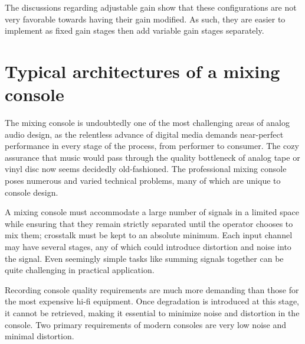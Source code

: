 The discussions regarding adjustable gain show that these configurations are
not very favorable towards having their gain modified. As such, they are easier
to implement as fixed gain stages then add variable gain stages separately.


%


\newpage
\section{Typical architectures of a mixing console}

The mixing console is undoubtedly one of the most challenging areas of analog
audio design, as the relentless advance of digital media demands near-perfect
performance in every stage of the process, from performer to consumer. The cozy
assurance that music would pass through the quality bottleneck of analog tape
or vinyl disc now seems decidedly old-fashioned. The professional mixing
console poses numerous and varied technical problems, many of which are unique
to console design.

A mixing console must accommodate a large number of signals in a limited space
while ensuring that they remain strictly separated until the operator chooses
to mix them; crosstalk must be kept to an absolute minimum. Each input channel
may have several stages, any of which could introduce distortion and noise into
the signal. Even seemingly simple tasks like summing signals together can be
quite challenging in practical application.

Recording console quality requirements are much more demanding than those for
the most expensive hi-fi equipment. Once degradation is introduced at this
stage, it cannot be retrieved, making it essential to minimize noise and
distortion in the console. Two primary requirements of modern consoles are very
low noise and minimal distortion.

